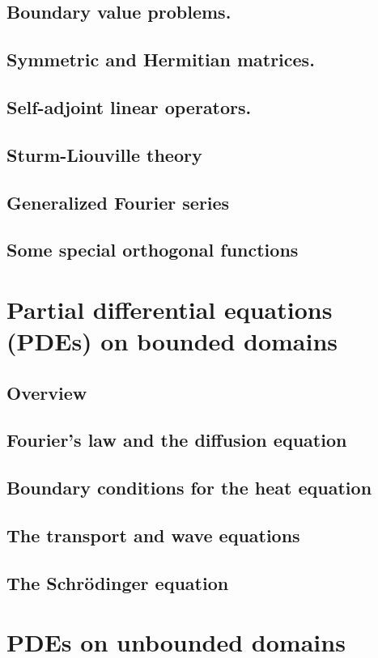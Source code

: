 \documentclass{article}
\begin{document}
\subsection{Boundary value problems.}
\subsection{Symmetric and Hermitian matrices.}
\subsection{Self-adjoint linear operators.}
\subsection{Sturm-Liouville theory}
\subsection{Generalized Fourier series}
\subsection{Some special orthogonal functions}
\pagebreak
\section{Partial differential equations (PDEs) on bounded domains}
\subsection*{Overview}
\subsection{Fourier's law and the diffusion equation}
\subsection{Boundary conditions for the heat equation}
\subsection{The transport and wave equations}
\subsection{The Schrödinger equation}
\pagebreak
\section{PDEs on unbounded domains}
\end{document}
